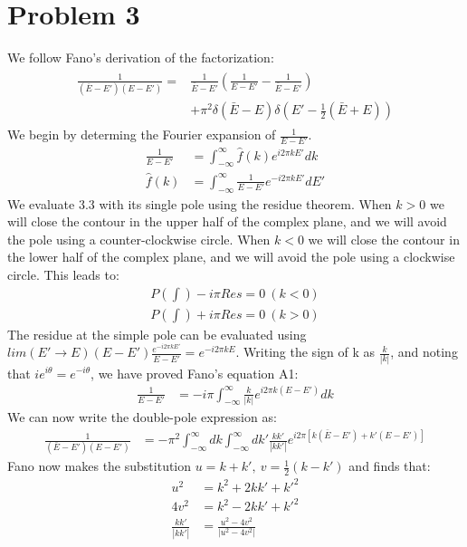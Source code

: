 \documentclass[a4paper,11pt]{article}
\numberwithin{equation}{section}
\newcommand{\pp}[1]{#1'}
\begin{document}
\section{Problem 3}
We follow Fano's derivation of the factorization:
\begin{align}
 \begin{split}
 \frac{1}{(\bar{E}-\pp{E})(E-\pp{E})} = &\frac{1}{\bar{E}-\pp{E}}\left(\frac{1}{E-\pp{E}}-\frac{1}{\bar{E}-\pp{E}} \right)\\
				      &+\pi^2\delta(\bar{E}-E)\delta(\pp{E}-\frac{1}{2}(\bar{E}+E))
 \end{split}
\end{align}
We begin by determing the Fourier expansion of $\frac{1}{E-\pp{E}}$.
\begin{align}
 \frac{1}{E-\pp{E}} &= \int_{-\infty}^\infty\hat{f}(k)e^{i2\pi k\pp{E}}dk\\
 \hat{f}(k) &= \int_{-\infty}^\infty \frac{1}{E-\pp{E}}e^{-i2\pi k\pp{E}}d\pp{E}
\end{align}
We evaluate 3.3 with its single pole using the residue theorem. 
When $k>0$ we will close the contour in the upper half of the complex plane, and we will avoid the pole using a counter-clockwise circle. 
When $k<0$ we will close the contour in the lower half of the complex plane, and we will avoid the pole using a clockwise circle.
This leads to:
\begin{align}
 P(\int) -i\pi Res = 0 \ (k<0)\\
 P(\int) +i\pi Res = 0 \ (k>0)
\end{align}
The residue at the simple pole can be evaluated using $lim(\pp{E} \rightarrow E)(E-\pp{E})\frac{ e^{-i2\pi k\pp{E}} }{E-\pp{E}}=e^{-i2\pi kE}$.
Writing the sign of k as $\frac{k}{|k|}$, and noting that $ie^{i\theta}=e^{-i\theta}$, we have proved Fano's equation A1:
\begin{align}
 \frac{1}{E-\pp{E}} &= -i\pi\int_{-\infty}^\infty \frac{k}{|k|}e^{i2\pi k(E-\pp{E})}dk
\end{align}
We can now write the double-pole expression as:
\begin{align}
 \frac{1}{(\bar{E}-\pp{E})(E-\pp{E})} &= -\pi^2\int_{-\infty}^\infty dk \int_{-\infty}^\infty d\pp{k}
	      \frac{k\pp{k}}{|k\pp{k}|}e^{i2\pi [ k(\bar{E}-\pp{E})+\pp{k}(E-\pp{E})]}
\end{align}
Fano now makes the substitution $u=k+\pp{k},\ v=\frac{1}{2}(k-\pp{k})$ and finds that:
\begin{align}
 u^2 &= k^2+2k\pp{k}+\pp{k}^2\\
 4v^2 &= k^2-2k\pp{k}+\pp{k}^2\\
 \frac{k\pp{k}}{|k\pp{k}|} &= \frac{u^2-4v^2}{|u^2-4v^2|}
\end{align}
\end{document}
